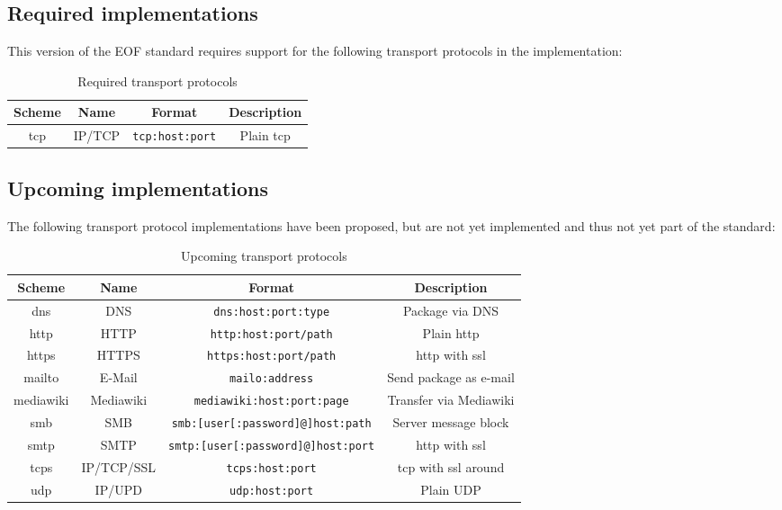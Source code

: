 \subsection{Required implementations}
\label{tprequired}
This version of the EOF standard requires support for the following
transport protocols in the implementation:
\begin{longtable}{|c|c|c|c|}
\caption{Required transport protocols}\\
\hline
\textbf{Scheme} & \textbf{Name} & \textbf{Format} & \textbf{Description}\\
\hline
tcp & IP/TCP & \verb=tcp:host:port= & Plain tcp\\
\hline
\end{longtable}
\subsection{Upcoming implementations}
\label{tpupcoming}
The following transport protocol implementations have been proposed,
but are not yet implemented and thus not yet part of the standard:

\begin{longtable}{|c|c|c|c|}
\caption{Upcoming transport protocols}\\
\hline
\textbf{Scheme} & \textbf{Name} & \textbf{Format} & \textbf{Description}\\
\hline
dns & DNS       & \verb=dns:host:port:type= & Package via DNS\\
\hline
http & HTTP       & \verb=http:host:port/path= & Plain http\\
\hline
https & HTTPS     & \verb=https:host:port/path= & http with ssl\\
\hline
mailto & E-Mail   & \verb=mailo:address= & Send package as e-mail\\
\hline
mediawiki & Mediawiki   & \verb=mediawiki:host:port:page= & Transfer via Mediawiki\\
\hline
smb  & SMB     & \verb=smb:[user[:password]@]host:path= & Server message block\\
\hline
smtp & SMTP     & \verb=smtp:[user[:password]@]host:port= & http with ssl\\
\hline
tcps & IP/TCP/SSL & \verb=tcps:host:port= & tcp with ssl around\\
\hline
udp & IP/UPD      & \verb=udp:host:port= & Plain UDP\\
\hline
\end{longtable}
